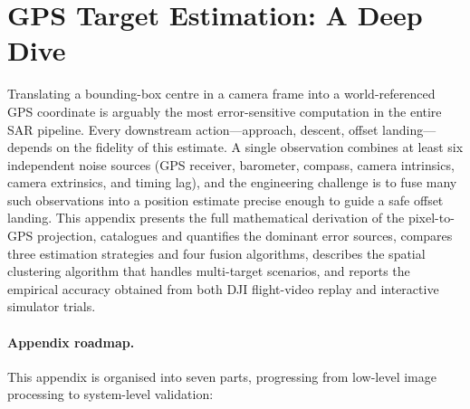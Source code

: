 
\section{GPS Target Estimation: A Deep Dive}\label{sec:gps-deep}

Translating a bounding-box centre in a camera frame into a world-referenced GPS coordinate is arguably the most error-sensitive computation in the entire SAR pipeline.  Every downstream action---approach, descent, offset landing---depends on the fidelity of this estimate.  A single observation combines at least six independent noise sources (GPS receiver, barometer, compass, camera intrinsics, camera extrinsics, and timing lag), and the engineering challenge is to fuse many such observations into a position estimate precise enough to guide a safe offset landing.  This appendix presents the full mathematical derivation of the pixel-to-GPS projection, catalogues and quantifies the dominant error sources, compares three estimation strategies and four fusion algorithms, describes the spatial clustering algorithm that handles multi-target scenarios, and reports the empirical accuracy obtained from both DJI flight-video replay and interactive simulator trials.

\paragraph{Appendix roadmap.}
This appendix is organised into seven parts, progressing from low-level image processing to system-level validation:

